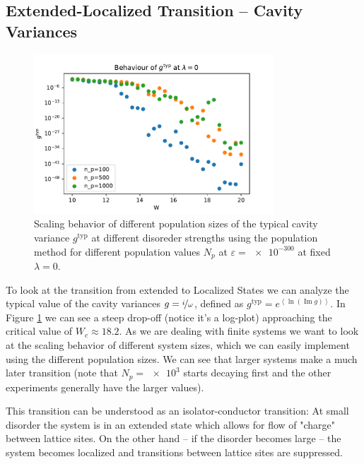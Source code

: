 \documentclass[../main.tex]{subfiles}
\begin{document}
\subsection{Extended-Localized Transition -- Cavity Variances}

\begin{figure}[htpb]
    \centering
    \includegraphics[width=0.8\textwidth]{../figures/ex3_population_method_scaling.pdf}
    \caption{Scaling behavior of different population sizes of the typical cavity variance $g^{\text{typ}}$ at different disoreder strengths using the population method for different population values $N_p$ at $\varepsilon = \num{e-300}$ at fixed $\lambda = 0$.}
    \label{fig:population_method}
\end{figure}

To look at the transition from extended to Localized States we can analyze the typical value of the cavity variances $g = \nicefrac{i}{\omega}$, defined as $g^{\text{typ}} = e^{\left<\ln( \operatorname{Im} g )  \right>}$.
In Figure \ref{fig:population_method} we can see a steep drop-off (notice it's a log-plot) approaching the critical value of $W_c \approx 18.2$.
As we are dealing with finite systems we want to look at the scaling behavior of different system sizes, which we can easily implement using the different population sizes.
We can see that larger systems make a much later transition (note that $N_p = \num{e3}$ starts decaying first and the other experiments generally have the larger values).
\par

This transition can be understood as an isolator-conductor transition:
At small disorder the system is in an extended state which allows for flow of "charge" between lattice sites.
On the other hand -- if the disorder becomes large -- the system becomes localized and transitions between lattice sites are suppressed.
\end{document}
